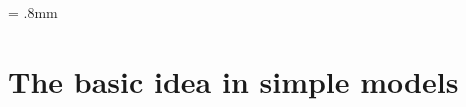 \documentclass[12pt]{article}
\begin{document}
 
\unitlength = .8mm




\section{The basic idea in simple models}
\end{document}
